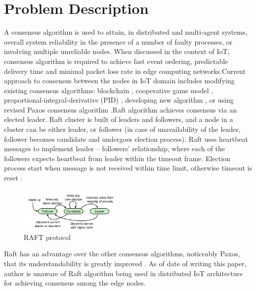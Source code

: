 \documentclass[	DIV=calc,%
							paper=a4,%
							fontsize=11pt,%
							twocolumn]{scrartcl}	 				%
\begin{document}
\section{Problem Description}
A consensus algorithm is used to attain, in distributed and multi-agent systems, overall system reliability in the presence of a number of faulty processes, or involving multiple unreliable nodes. When discussed in the context of IoT, consensus algorithm is required to achieve fast event ordering, predictable delivery time and minimal packet loss rate in edge computing networks.\smallskip \newline Current approach to consensus between the nodes in IoT domain  includes modifying existing consensus algorithms: blockchain \cite{ WANG2020101871,10.1007/978-3-030-30278-8_34}, cooperative game model \cite{GULATI2020102222}, proportional-integral-derivative (PID) \cite{SHI201873}, developing new algorithm \cite{8737532}, or using revised Paxos consensus algorithm \cite{10.5555/3324320.3324322, Cachin2010YetAV}.\smallskip \newline Raft algorithm achieves consensus via an elected leader. Raft cluster is built of leaders and followers, and a node in a cluster can be either leader, or follower (in case of unavailability of the leader, follower becomes candidate and undergoes election process). Raft uses heartbeat messages to implement leader – followers’ relationship, where each of the followers expects heartbeat from leader within the timeout frame. Election process start when message is not received within time limit, otherwise timeout is reset \cite{10.5555/2643634.2643666}.
\begin{figure}[H]
\centering
\includegraphics[width=0.45\textwidth]{images/raft_alg.png}
\caption{RAFT protocol}
\end{figure}
\noindent Raft has an advantage over the other consensus algorithms, noticeably Paxos, that its understandability is greatly improved \cite{UCAM-CL-TR-857}. As of date of writing this paper, author is unaware of Raft algorithm being used in distributed IoT architecture for achieving consensus among the edge nodes.
\end{document}
